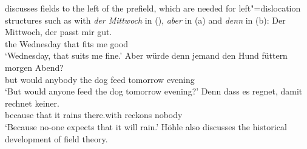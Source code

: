\citet{Hoehle86} discusses fields to the left of the prefield, which are needed for left"=dislocation structures
such as with \emph{der Mittwoch} in (), \emph{aber} in (a) and \emph{denn} in (b):
\ea
\gll Der Mittwoch, der passt mir gut.\\
	 the Wednesday that fits me good\\
\glt `Wednesday, that suits me fine.'
\z
\eal
\ex 
\gll Aber würde denn jemand den Hund füttern morgen Abend?\\
     but would \particle{} anybody the dog feed tomorrow evening\\
\glt `But would anyone feed the dog tomorrow evening?'
\ex 
\gll Denn dass es regnet, damit rechnet keiner.\\
     because that it rains there.with reckons nobody\\
\glt `Because no-one expects that it will rain.'
\zl
Höhle also discusses the historical development of field theory.

